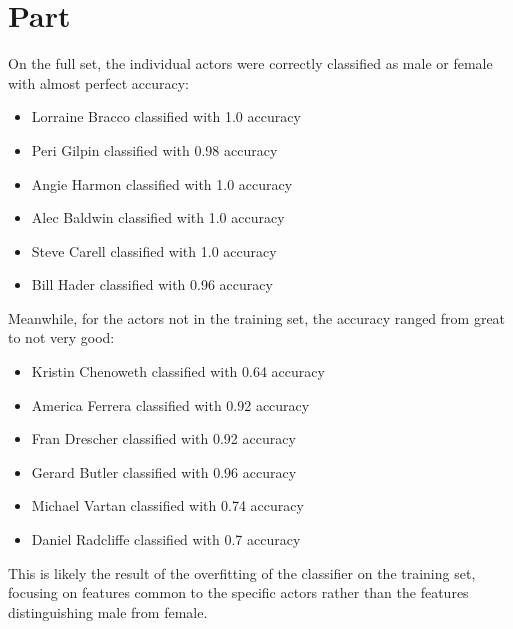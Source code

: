 \documentclass{article}
\newcommand{\enterproblemHeader}[1]{
}
\newcommand{\exitproblemHeader}[1]{
}
\newcounter{problem} %
\newcommand{\problemName}{}
\newenvironment{problem}[1][Part \theproblem]{ %
	\stepcounter{problem} %
	\renewcommand{\problemName}{#1} %
	\section{\problemName} %
	\enterproblemHeader{\problemName} %
}{
	\exitproblemHeader{\problemName} %
}
\begin{document}
\begin{problem}
	On the full set, the individual actors were correctly classified as male or female with almost perfect accuracy:
	\begin{itemize}
		\item Lorraine Bracco classified with 1.0 accuracy
		\item Peri Gilpin classified with 0.98 accuracy
		\item Angie Harmon classified with 1.0 accuracy
		\item Alec Baldwin classified with 1.0 accuracy
		\item Steve Carell classified with 1.0 accuracy
		\item Bill Hader classified with 0.96 accuracy
	\end{itemize}
	Meanwhile, for the actors not in the training set, the accuracy ranged from great to not very good:
	\begin{itemize}
		\item Kristin Chenoweth classified with 0.64 accuracy
		\item America Ferrera classified with 0.92 accuracy
		\item Fran Drescher classified with 0.92 accuracy
		\item Gerard Butler classified with 0.96 accuracy
		\item Michael Vartan classified with 0.74 accuracy
		\item Daniel Radcliffe classified with 0.7 accuracy
	\end{itemize}
	This is likely the result of the overfitting of the classifier on the training set, focusing on features common to the specific actors rather than the features distinguishing male from female.
\end{problem}
\clearpage

\end{document}
